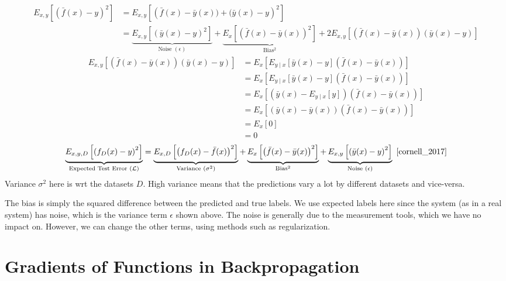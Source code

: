 \documentclass{article}
\numberwithin{equation}{subsection}
\begin{document}
\begin{align}
	E_{x, y} \left[ \left(\bar{f}(x) - y \right)^{2}\right] &= E_{x, y} \left[ \left(\bar{f}(x) -\bar y(x) )+(\bar y(x) - y \right)^{2}\right]  \\
  &=\underbrace{E_{x, y} \left[\left(\bar{y}(x) - y\right)^{2}\right]}_{\text{Noise }(\epsilon)} + \underbrace{E_{x} \left[\left(\bar{f}(x) - \bar{y}(x)\right)^{2}\right]}_\mathrm{Bias^2} + 2 E_{x, y} \left[ \left(\bar{f}(x) - \bar{y}(x)\right)\left(\bar{y}(x) - y\right)\right]
\end{align}
\begin{align}
	E_{x, y} \left[\left(\bar{f}(x) - \bar{y}(x)\right)\left(\bar{y}(x) - y\right)\right] &= E_{x}\left[E_{y \mid x} \left[\bar{y}(x) - y \right] \left(\bar{f}(x) - \bar{y}(x) \right) \right] \\
    &= E_{x} \left[ E_{y \mid x} \left[ \bar{y}(x) - y\right] \left(\bar{f}(x) - \bar{y}(x)\right)\right] \\
    &= E_{x} \left[ \left( \bar{y}(x) - E_{y \mid x} \left [ y \right]\right) \left(\bar{f}(x) - \bar{y}(x)\right)\right] \\
    &= E_{x} \left[ \left( \bar{y}(x) - \bar{y}(x) \right) \left(\bar{f}(x) - \bar{y}(x)\right)\right] \\
    &= E_{x} \left[ 0 \right] \\
    &= 0
\end{align}
\begin{equation}
	\underbrace{E_{x, y, D} \left[\left(f_D(x) - y\right)^{2}\right]}_{\text{Expected Test Error }(\mathcal{L})} = \underbrace{E_{x, D}\left[\left(f_D(x) - \bar{f}(x)\right)^{2}\right]}_{\text{Variance }(\sigma^2)} + \underbrace{E_{x}\left[\left(\bar{f}(x) - \bar{y}(x)\right)^{2}\right]}_\mathrm{Bias^2} + \underbrace{E_{x, y}\left[\left(\bar{y}(x) - y\right)^{2}\right]}_{\text{Noise }(\epsilon)}~\cite{cornell_2017} 
\end{equation}
Variance $\sigma^2$ here is wrt the datasets $D$. High variance means that the predictions vary a lot by different datasets and vice-versa. 

The bias is simply the squared difference between the predicted and true labels. We use expected labels here since the system (as in a real system) has noise, which is the variance term $\epsilon$ shown above. The noise is generally due to the measurement tools, which we have no impact on. However, we can change the other terms, using methods such as regularization.
\section{Gradients of Functions in Backpropagation}
\end{document}
